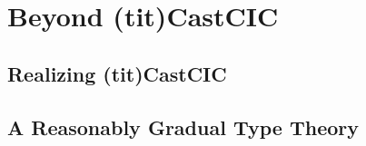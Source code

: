 \chapter{Beyond \kl(tit){CastCIC}}
\label{chap:beyond-gcic}

\section{Realizing \kl(tit){CastCIC}}
\label{sec:realizing-cast-calculus}


\section{A Reasonably Gradual Type Theory}
\label{sec:ReTT}